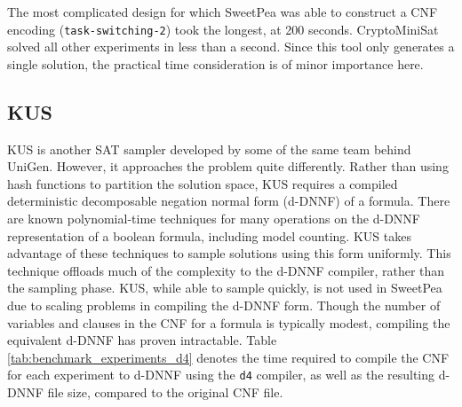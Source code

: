 The most complicated design for which SweetPea was able to construct a CNF encoding (\texttt{task-switching-2}) took the longest, at 200 seconds. CryptoMiniSat solved all other experiments in less than a second. Since this tool only generates a single solution, the practical time consideration is of minor importance here.


\subsection{KUS}

KUS \cite{SGRM18} is another SAT sampler developed by some of the same team behind UniGen. However, it approaches the problem quite differently. Rather than using hash functions to partition the solution space, KUS requires a compiled deterministic decomposable negation normal form (d-DNNF) of a formula. There are known polynomial-time techniques for many operations on the d-DNNF representation of a boolean formula, including model counting. KUS takes advantage of these techniques to sample solutions using this form uniformly. This technique offloads much of the complexity to the d-DNNF compiler, rather than the sampling phase. KUS, while able to sample quickly, is not used in SweetPea due to scaling problems in compiling the d-DNNF form. Though the number of variables and clauses in the CNF for a formula is typically modest, compiling the equivalent d-DNNF has proven intractable. Table \ref{tab:benchmark_experiments_d4} denotes the time required to compile the CNF for each experiment to d-DNNF using the \texttt{d4} compiler, as well as the resulting d-DNNF file size,  compared to the original CNF file.





